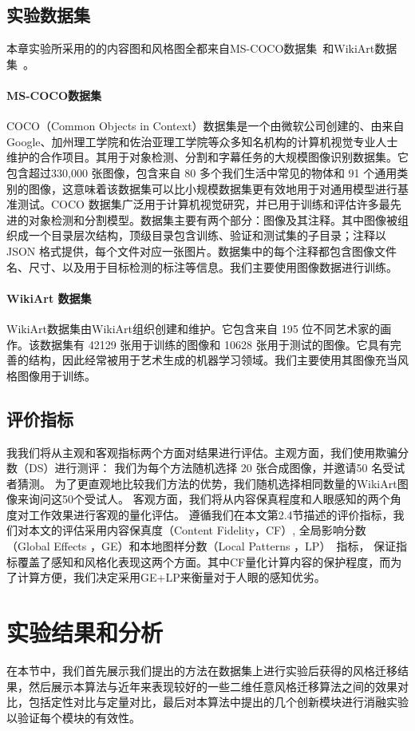 \subsection{实验数据集}
本章实验所采用的的内容图和风格图全都来自MS-COCO数据集~\cite{lin2014microsoft}和WikiArt数据集~\cite{wikiart2018}。
\paragraph{MS-COCO数据集}
COCO（Common Objects in Context）数据集是一个由微软公司创建的、由来自 Google、加州理工学院和佐治亚理工学院等众多知名机构的计算机视觉专业人士维护的合作项目。其用于对象检测、分割和字幕任务的大规模图像识别数据集。它包含超过330,000 张图像，包含来自 80 多个我们生活中常见的物体和 91 个通用类别的图像，这意味着该数据集可以比小规模数据集更有效地用于对通用模型进行基准测试。COCO 数据集广泛用于计算机视觉研究，并已用于训练和评估许多最先进的对象检测和分割模型。数据集主要有两个部分：图像及其注释。其中图像被组织成一个目录层次结构，顶级目录包含训练、验证和测试集的子目录；注释以 JSON 格式提供，每个文件对应一张图片。数据集中的每个注释都包含图像文件名、尺寸、以及用于目标检测的标注等信息。我们主要使用图像数据进行训练。
\paragraph{WikiArt 数据集}
WikiArt数据集由WikiArt组织创建和维护。它包含来自 195 位不同艺术家的画作。该数据集有 42129 张用于训练的图像和 10628 张用于测试的图像。它具有完善的结构，因此经常被用于艺术生成的机器学习领域。我们主要使用其图像充当风格图像用于训练。

\subsection{评价指标}
我我们将从主观和客观指标两个方面对结果进行评估。主观方面，我们使用欺骗分数（DS）进行测评：
我们为每个方法随机选择 20 张合成图像，并邀请50 名受试者猜测。
为了更直观地比较我们方法的优势，我们随机选择相同数量的WikiArt图像来询问这50个受试人。
客观方面，我们将从内容保真程度和人眼感知的两个角度对工作效果进行客观的量化评估。
遵循我们在本文第2.4节描述的评价指标，我们对本文的评估采用内容保真度（Content Fidelity，CF）, 
全局影响分数（Global Effects ，GE）和本地图样分数（Local Patterns ，LP）~\cite{wang2021evaluate}指标，
保证指标覆盖了感知和风格化表现这两个方面。其中CF量化计算内容的保护程度，而为了计算方便，我们决定采用GE+LP来衡量对于人眼的感知优劣。

\section{实验结果和分析}
在本节中，我们首先展示我们提出的方法在数据集上进行实验后获得的风格迁移结果，然后展示本算法与近年来表现较好的一些二维任意风格迁移算法之间的效果对比，包括定性对比与定量对比，最后对本算法中提出的几个创新模块进行消融实验以验证每个模块的有效性。
